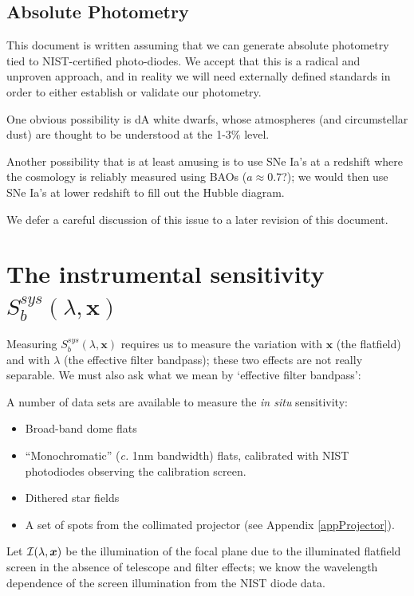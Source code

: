 \documentclass[12pt]{article}
\renewcommand{\c}{\textit{c.}\xspace}
\newcommand{\xb}{{\boldsymbol x}}
\newcommand{\screen}{{\cal I}}
\begin{document}
\subsection{Absolute Photometry}

This document is written assuming that we can generate absolute photometry tied to NIST-certified
photo-diodes.  We accept that this is a radical and unproven approach, and in reality we will need externally
defined standards in order to either establish or validate our photometry.

One obvious possibility is dA white dwarfs, whose atmospheres (and circumstellar dust)
are thought to be understood at the 1-3\% level.

Another possibility that is at least amusing is to use SNe Ia's at a redshift where the cosmology is reliably
measured using BAOs ($a \approx 0.7$?); we would then use SNe Ia's at lower redshift to fill out the Hubble
diagram.

We defer a careful discussion of this issue to a later revision of this document.

\section{The instrumental sensitivity \texorpdfstring{$S_b^{sys}(\lambda, \xb)$}{Sb}}
\label{secInstrumental}

Measuring $S_b^{sys}(\lambda, \xb)$ requires us to measure the variation with $\xb$ (the flatfield)
and with $\lambda$ (the effective filter bandpass);  these two effects are not really separable.  We
must also ask what we mean by `effective filter bandpass':

A number of data sets are available to measure the \textit{in situ} sensitivity:
\begin{itemize}
  \item Broad-band dome flats
  \item ``Monochromatic'' (\c 1nm bandwidth) flats, calibrated with NIST photodiodes observing the calibration screen.
  \item Dithered star fields
  \item A set of spots from the collimated projector (see Appendix \ref{appProjector}).
\end{itemize}

Let $\screen(\lambda, \xb)$ be the illumination of the focal plane due to the illuminated flatfield screen
in the absence of telescope and filter effects;
we know the wavelength dependence of the screen illumination from the NIST diode data.
\end{document}
